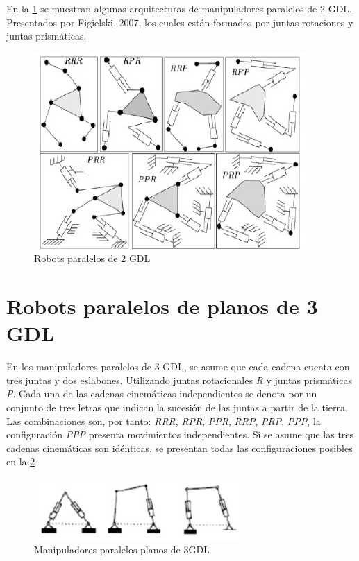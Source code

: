 \documentclass[11pt,a4paper,oldfontcommands,oneside]{memoir}
\begin{document}
En la \ref{Figure 1} se muestran algunas arquitecturas de manipuladores paralelos de 2 GDL. Presentados por Figielski, 2007, los cuales están formados por juntas rotaciones y juntas prismáticas.

\begin{figure}[htp]
\centering
\includegraphics[scale=1.00]{1.jpg}
\caption{Robots paralelos de 2 GDL}
\label{Figure 1}
\end{figure}

\section{Robots paralelos de planos de 3 GDL}

En los manipuladores paralelos de 3 GDL, se asume que cada cadena cuenta con tres juntas y dos eslabones. Utilizando juntas rotacionales \textit{R} y juntas prismáticas \textit{P}. Cada una de las cadenas cinemáticas independientes se denota por un conjunto de tres letras que indican la sucesión de las juntas a partir de la tierra. Las combinaciones son, por tanto: \textit {RRR}, \textit {RPR}, \textit {PPR}, \textit {RRP}, \textit {PRP}, \textit {PPP}, la configuración \textit {PPP} presenta movimientos independientes. Si se asume que las tres cadenas cinemáticas son idénticas, se presentan todas las configuraciones posibles en la \ref {Figure 2}

\begin{figure}[htp]
\centering
\includegraphics[width=8cm]{2.jpg}
\caption{Manipuladores paralelos planos de 3GDL}
\label{Figure 2}
\end{figure}
\end{document}
